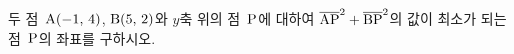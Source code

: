두 점~$\mathrm{A}(-1,\,4)$, $\mathrm{B}(5,\,2)$와 $y$축 위의 점~$\mathrm{P}$에 대하여 $\overline{\mathrm{AP}}^2+\overline{\mathrm{BP}}^2$의 값이 최소가 되는 점~$\mathrm{P}$의 좌표를 구하시오.
